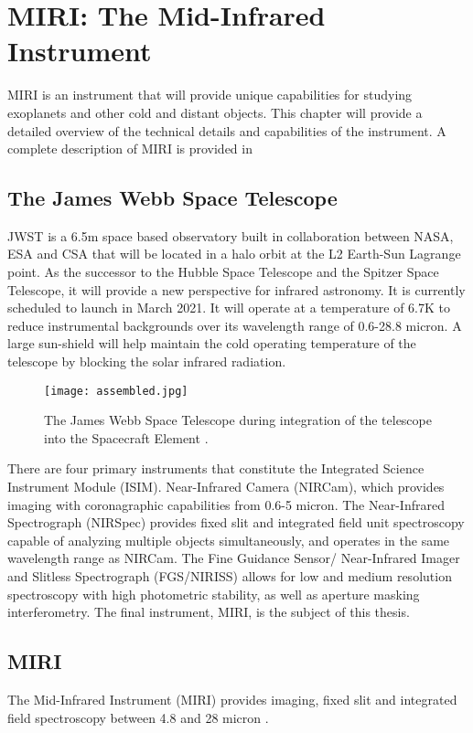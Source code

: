 \chapter{MIRI: The Mid-Infrared Instrument}
MIRI is an instrument that will provide unique capabilities for studying exoplanets and other cold and distant objects. This chapter will provide a detailed overview of the technical details and capabilities of the instrument. A complete description of MIRI is provided in \autocite{MIRI1,MIRI2,10.1086/6822554, MIRI4,MIRI5,MIRI6,MIRI7,MIRI8,MIRI9}
%
%
\section{The James Webb Space Telescope}
JWST is a 6.5m space based observatory built in collaboration between NASA, ESA and CSA that will be located in a halo orbit at the L2 Earth-Sun Lagrange point. 
As the successor to the Hubble Space Telescope and the Spitzer Space Telescope, it will provide a new perspective for infrared astronomy. 
It is currently scheduled to launch in March 2021.
It will operate at a temperature of 6.7K to reduce instrumental backgrounds over its wavelength range of 0.6-28.8 micron.
A large sun-shield will help maintain the cold operating temperature of the telescope by blocking the solar infrared radiation. 
\begin{figure}[t]
	\texttt{[image: assembled.jpg]}
	\caption{The James Webb Space Telescope during integration of the telescope into the Spacecraft Element \autocite{assembled}. }
	\label{fig:jwst}
\end{figure}

There are four primary instruments that constitute the Integrated Science Instrument Module (ISIM). 
Near-Infrared Camera (NIRCam), which provides imaging with coronagraphic capabilities from 0.6-5 micron.
The Near-Infrared Spectrograph (NIRSpec) provides fixed slit and integrated field unit spectroscopy capable of analyzing multiple objects simultaneously, and operates in the same wavelength range as NIRCam.
The Fine Guidance Sensor/ Near-Infrared Imager and Slitless Spectrograph (FGS/NIRISS) allows for low and medium resolution spectroscopy with high photometric stability, as well as aperture masking interferometry. 
The final instrument, MIRI, is the subject of this thesis.

\section{MIRI}
The Mid-Infrared Instrument (MIRI) provides imaging, fixed slit and integrated field spectroscopy between 4.8 and 28 micron \autocite{Rieke2015}. %

